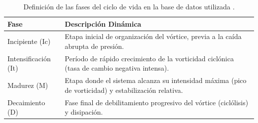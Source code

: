 \begin{table}[ht]
\centering
\caption[Definición de las fases del ciclo de vida]{Definición de las fases del ciclo de vida en la base de datos utilizada \citep{coutodesouza2024new}.}
\label{tab:fases_def}
\begin{tabular*}{\textwidth}{@{\extracolsep{\fill}}lp{10cm}}
\hline
Fase & Descripción Dinámica \\ 
\hline
Incipiente (Ic) & Etapa inicial de organización del vórtice, previa a la caída abrupta de presión. \\ 
Intensificación (It) & Período de rápido crecimiento de la vorticidad ciclónica (tasa de cambio negativa intensa). \\ 
Madurez (M) & Etapa donde el sistema alcanza su intensidad máxima (pico de vorticidad) y estabilización relativa. \\ 
Decaimiento (D) & Fase final de debilitamiento progresivo del vórtice (ciclólisis) y disipación. \\ 
\hline
\end{tabular*}
\end{table}


